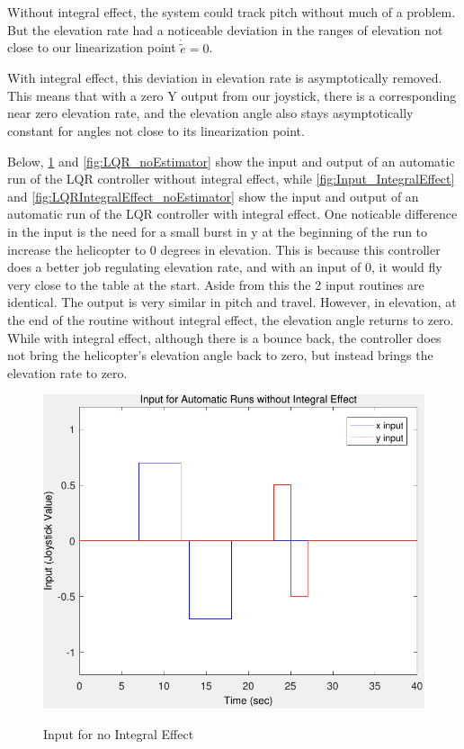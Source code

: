 Without integral effect, the system could track pitch without much of
a problem. But the elevation rate had a noticeable deviation in the
ranges of elevation not close to our linearization point
$\dot{\tilde{e}} = 0$.

With integral effect, this deviation in elevation rate is
asymptotically removed. This means that with a zero Y output from our
joystick, there is a corresponding near zero elevation rate, and the
elevation angle also stays asymptotically constant for angles not
close to its linearization point.

Below, \cref{fig:Input_noIntegralEffect} and \cref{fig:LQR_noEstimator} show the input and output of an automatic run of the LQR controller without integral effect, while \cref{fig:Input_IntegralEffect} and \cref{fig:LQRIntegralEffect_noEstimator} show the input and output of an automatic run of the LQR controller with integral effect. One noticable difference in the input is the need for a small burst in y at the beginning of the run to increase the helicopter to 0 degrees in elevation. This is because this controller does a better job regulating elevation rate, and with an input of 0, it would fly very close to the table at the start. Aside from this the 2 input routines are identical. The output is very similar in pitch and travel. However, in elevation, at the end of the routine without integral effect, the elevation angle returns to zero. While with integral effect, although there is a bounce back, the controller does not bring the helicopter's elevation angle back to zero, but instead brings the elevation rate to zero.

\begin{figure}
\caption{Input for no Integral Effect}
	\centering
		\includegraphics[scale =0.6]{images/input_noIntegralEffect.pdf}
	\label{fig:Input_noIntegralEffect}
\end{figure}

